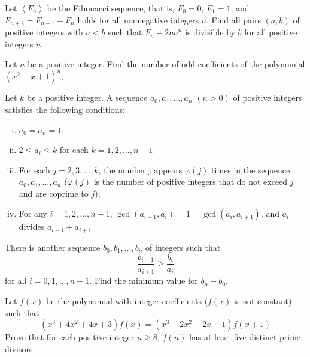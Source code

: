 \documentclass[problems.tex]{subfile}
\begin{document}
	
	
	\begin{problem}
		Let $\left< F_n\right>$ be the Fibonacci sequence, that is, $F_0=0$, $F_1=1$, and $F_{n+2}=F_{n+1}+F_{n}$ holds for all nonnegative integers $n$.
		Find all pairs $(a,b)$ of positive integers with $a < b$ such that $F_n-2na^n$ is divisible by $b$ for all positive integers $n$. %
	\end{problem}
	
	
	
	\begin{problem}
		Let $n$ be a positive integer. Find the number of odd coefficients of the polynomial $(x^2-x+1)^n$. %
	\end{problem}
	
	
	
	\begin{problem}
		Let $k$ be a positive integer. A sequence $a_0, a_1, \dots, a_n$ $(n>0)$ of positive integers satisfies the following conditions:
		\begin{enumerate}[(i)]
			\item $a_0=a_n=1$;
			\item $2\leq a_i\leq k$ for each $k=1,2,\dots,n-1$
			\item For each $j=2,3,\dots,k$, the number j appears $\varphi (j)$ times in the sequence $a_0,a_1,\dots,a_n$ ($\varphi (j)$ is the number of positive integers that do not exceed $j$ and are coprime to $j$);
			\item For any $i=1,2,\dots,n-1$, $\gcd(a_{i-1},a_i)=1=\gcd(a_i,a_{i+1})$, and $a_i$ divides $a_{i-1}+a_{i+1}$
		\end{enumerate}
		There is another sequence $b_0,b_1,\dots,b_n$ of integers such that $$\frac{b_{i+1}}{a_{i+1}}>\frac{b_i}{a_i}$$ for all $i=0,1,\dots,n-1$. Find the minimum value for $b_n-b_0$. %
	\end{problem}
	
	
	
	\begin{problem}
		Let $f(x)$ be the polynomial with integer coefficients ($f(x)$ is not constant) such that
		\[(x^3+4x^2+4x+3)f(x)=(x^3-2x^2+2x-1)f(x+1)\]Prove that for each positive integer $n\geq8$, $f(n)$ has at least five distinct prime divisors. %
	\end{problem}
	
\end{document}
